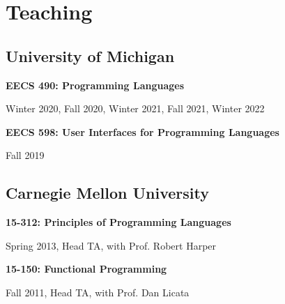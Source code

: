 \documentclass[10pt,letterpaper]{article}
\renewenvironment{itemize}{
  \begin{list}{}{
    \setlength{\leftmargin}{1.25em}
    \setlength{\itemsep}{0.25em}
    \setlength{\parskip}{0pt}
    \setlength{\parsep}{0.2em}
  }
}{
  \end{list}
}
\begin{document}
%


\section*{Teaching}
\subsection*{University of Michigan}
\begin{itemize}
  \item \textbf{EECS 490: Programming Languages} 
    \begin{itemize}
      \item Winter 2020, Fall 2020, Winter 2021, Fall 2021, Winter 2022
    \end{itemize}
  \item \textbf{EECS 598: User Interfaces for Programming Languages}
    \begin{itemize} 
      \item Fall 2019
    \end{itemize}
\end{itemize}

\subsection*{Carnegie Mellon University}
\begin{itemize}
  \item \textbf{15-312: Principles of Programming Languages} 
        \begin{itemize}
          \item Spring 2013, Head TA, with Prof. Robert Harper
        \end{itemize}
  \item \textbf{15-150: Functional Programming}
      \begin{itemize}
        \item Fall 2011, Head TA, with Prof. Dan Licata
      \end{itemize}
\end{itemize}
\end{document}
